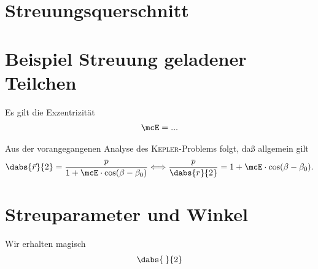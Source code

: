 \documentclass[../WiSe22ANA3.tex]{subfiles}
\begin{document}
		\section{Streuungsquerschnitt}
			
			
		\section{Beispiel Streuung geladener Teilchen}
			\begin{bsp}
				
				Es gilt die Exzentrizität
				\begin{align*}
					\mcE=...
				\end{align*}
			\end{bsp}
			Aus der vorangegangenen Analyse des \textsc{Kepler}-Problems folgt, daß allgemein gilt
			\begin{align*}
				\dabs{\vec r}{2}=\frac{p}{1+\mcE\cdot\cos(\beta-\beta_0)}\Longleftrightarrow\frac{p}{\dabs{r}{2}}=1+\mcE\cdot\cos(\beta-\beta_0). 
			\end{align*}
			
			
		\section{Streuparameter und Winkel}
			\begin{uups}
				Wir erhalten magisch 
				\begin{align*}
					\dabs{\frac{}{}}{2}
				\end{align*}
			\end{uups}
\end{document}
